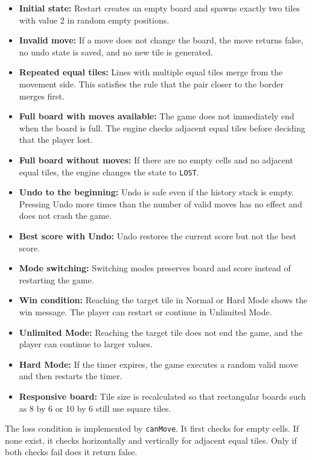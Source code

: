 \documentclass[a4paper,12pt]{article}
\begin{document}
\begin{itemize}
    \item \textbf{Initial state:} Restart creates an empty board and spawns exactly two tiles with value 2 in random empty positions.
    \item \textbf{Invalid move:} If a move does not change the board, the move returns false, no undo state is saved, and no new tile is generated.
    \item \textbf{Repeated equal tiles:} Lines with multiple equal tiles merge from the movement side. This satisfies the rule that the pair closer to the border merges first.
    \item \textbf{Full board with moves available:} The game does not immediately end when the board is full. The engine checks adjacent equal tiles before deciding that the player lost.
    \item \textbf{Full board without moves:} If there are no empty cells and no adjacent equal tiles, the engine changes the state to \texttt{LOST}.
    \item \textbf{Undo to the beginning:} Undo is safe even if the history stack is empty. Pressing Undo more times than the number of valid moves has no effect and does not crash the game.
    \item \textbf{Best score with Undo:} Undo restores the current score but not the best score.
    \item \textbf{Mode switching:} Switching modes preserves board and score instead of restarting the game.
    \item \textbf{Win condition:} Reaching the target tile in Normal or Hard Mode shows the win message. The player can restart or continue in Unlimited Mode.
    \item \textbf{Unlimited Mode:} Reaching the target tile does not end the game, and the player can continue to larger values.
    \item \textbf{Hard Mode:} If the timer expires, the game executes a random valid move and then restarts the timer.
    \item \textbf{Responsive board:} Tile size is recalculated so that rectangular boards such as 8 by 6 or 10 by 6 still use square tiles.
\end{itemize}

The loss condition is implemented by \texttt{canMove}. It first checks for empty cells. If none exist, it checks horizontally and vertically for adjacent equal tiles. Only if both checks fail does it return false.
\end{document}
